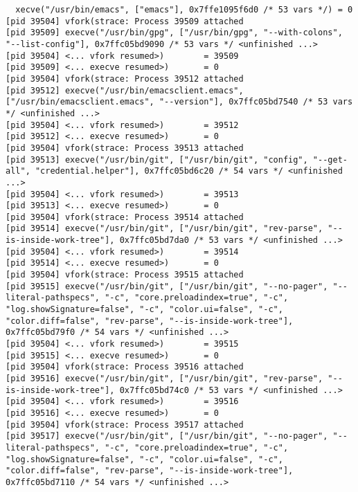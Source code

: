 \documentclass[11pt]{article}
\begin{document}
\begin{lstlisting}
  xecve("/usr/bin/emacs", ["emacs"], 0x7ffe1095f6d0 /* 53 vars */) = 0
[pid 39504] vfork(strace: Process 39509 attached
[pid 39509] execve("/usr/bin/gpg", ["/usr/bin/gpg", "--with-colons", "--list-config"], 0x7ffc05bd9090 /* 53 vars */ <unfinished ...>
[pid 39504] <... vfork resumed>)        = 39509
[pid 39509] <... execve resumed>)       = 0
[pid 39504] vfork(strace: Process 39512 attached
[pid 39512] execve("/usr/bin/emacsclient.emacs", ["/usr/bin/emacsclient.emacs", "--version"], 0x7ffc05bd7540 /* 53 vars */ <unfinished ...>
[pid 39504] <... vfork resumed>)        = 39512
[pid 39512] <... execve resumed>)       = 0
[pid 39504] vfork(strace: Process 39513 attached
[pid 39513] execve("/usr/bin/git", ["/usr/bin/git", "config", "--get-all", "credential.helper"], 0x7ffc05bd6c20 /* 54 vars */ <unfinished ...>
[pid 39504] <... vfork resumed>)        = 39513
[pid 39513] <... execve resumed>)       = 0
[pid 39504] vfork(strace: Process 39514 attached
[pid 39514] execve("/usr/bin/git", ["/usr/bin/git", "rev-parse", "--is-inside-work-tree"], 0x7ffc05bd7da0 /* 53 vars */ <unfinished ...>
[pid 39504] <... vfork resumed>)        = 39514
[pid 39514] <... execve resumed>)       = 0
[pid 39504] vfork(strace: Process 39515 attached
[pid 39515] execve("/usr/bin/git", ["/usr/bin/git", "--no-pager", "--literal-pathspecs", "-c", "core.preloadindex=true", "-c", "log.showSignature=false", "-c", "color.ui=false", "-c", "color.diff=false", "rev-parse", "--is-inside-work-tree"], 0x7ffc05bd79f0 /* 54 vars */ <unfinished ...>
[pid 39504] <... vfork resumed>)        = 39515
[pid 39515] <... execve resumed>)       = 0
[pid 39504] vfork(strace: Process 39516 attached
[pid 39516] execve("/usr/bin/git", ["/usr/bin/git", "rev-parse", "--is-inside-work-tree"], 0x7ffc05bd74c0 /* 53 vars */ <unfinished ...>
[pid 39504] <... vfork resumed>)        = 39516
[pid 39516] <... execve resumed>)       = 0
[pid 39504] vfork(strace: Process 39517 attached
[pid 39517] execve("/usr/bin/git", ["/usr/bin/git", "--no-pager", "--literal-pathspecs", "-c", "core.preloadindex=true", "-c", "log.showSignature=false", "-c", "color.ui=false", "-c", "color.diff=false", "rev-parse", "--is-inside-work-tree"], 0x7ffc05bd7110 /* 54 vars */ <unfinished ...>

\end{lstlisting}
\end{document}
